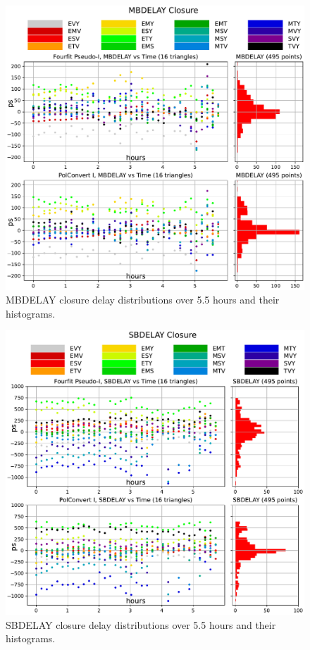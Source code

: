 \documentclass[letterpaper,twoside,12pt]{article}
\begin{document}
\begin{figure}[h!]
  \centering
  \includegraphics[width=40pc]{MBDELAY_Closure_Delay.pdf}
  \caption{\small MBDELAY closure delay distributions over 5.5 hours and their histograms.}
  \label{mbd}
\end{figure}


\begin{figure}[ht!]
  \begin{center}
  \includegraphics[width=40pc]{SBDELAY_Closure_Delay.pdf}
  \caption{\small SBDELAY closure delay distributions over 5.5 hours and their histograms.}
  \label{sbd}
  \end{center}
\end{figure}
\end{document}
